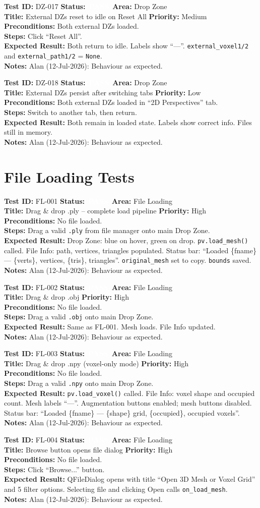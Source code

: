 \documentclass[12pt,a4paper]{article}
\newcommand{\statuspass}{\colorbox{statusgreen}{\textcolor{white}{\textbf{\,PASS\,}}}}
\newcommand{\testcase}[9]{%
  \smallskip
  \noindent\textbf{Test ID:} #1 \hfill \textbf{Status:} #2 \hfill \textbf{Area:} #3 \\
  \textbf{Title:} #4 \hfill \textbf{Priority:} #5 \\[0.3em]
  \textbf{Preconditions:} #6 \\[0.3em]
  \textbf{Steps:} #7 \\[0.3em]
  \textbf{Expected Result:} #8 \\
  \textbf{Notes:} #9
  \smallskip
}
\begin{document}
\testcase{DZ-017}{\statuspass}{Drop Zone}{External DZs reset to idle on Reset All}{Medium}{Both external DZs loaded.}{Click ``Reset All''.}{Both return to idle. Labels show ``---''. \texttt{external\_voxel1/2} and \texttt{external\_path1/2} = \texttt{None}.}{Alan (12-Jul-2026): Behaviour as expected.}


\testcase{DZ-018}{\statuspass}{Drop Zone}{External DZs persist after switching tabs}{Low}{Both external DZs loaded in ``2D Perspectives'' tab.}{Switch to another tab, then return.}{Both remain in loaded state. Labels show correct info. Files still in memory.}{Alan (12-Jul-2026): Behaviour as expected.}



\section{File Loading Tests}

\testcase{FL-001}{\statuspass}{File Loading}{Drag \& drop .ply -- complete load pipeline}{High}{No file loaded.}{Drag a valid \texttt{.ply} from file manager onto main Drop Zone.}{Drop Zone: blue on hover, green on drop. \texttt{pv.load\_mesh()} called. File Info: path, vertices, triangles populated. Status bar: ``Loaded \{fname\} --- \{verts\}, vertices, \{tris\}, triangles''. \texttt{original\_mesh} set to copy. \texttt{bounds} saved.}{Alan (12-Jul-2026): Behaviour as expected.}


\testcase{FL-002}{\statuspass}{File Loading}{Drag \& drop .obj}{High}{No file loaded.}{Drag a valid \texttt{.obj} onto main Drop Zone.}{Same as FL-001. Mesh loads. File Info updated.}{Alan (12-Jul-2026): Behaviour as expected.}


\testcase{FL-003}{\statuspass}{File Loading}{Drag \& drop .npy (voxel-only mode)}{High}{No file loaded.}{Drag a valid \texttt{.npy} onto main Drop Zone.}{\texttt{pv.load\_voxel()} called. File Info: voxel shape and occupied count. Mesh labels ``---''. Augmentation buttons enabled; mesh buttons disabled. Status bar: ``Loaded \{fname\} --- \{shape\} grid, \{occupied\}, occupied voxels''.}{Alan (12-Jul-2026): Behaviour as expected.}


\testcase{FL-004}{\statuspass}{File Loading}{Browse button opens file dialog}{High}{No file loaded.}{Click ``Browse...'' button.}{QFileDialog opens with title ``Open 3D Mesh or Voxel Grid'' and 5 filter options. Selecting file and clicking Open calls \texttt{on\_load\_mesh}.}{Alan (12-Jul-2026): Behaviour as expected.}
\end{document}
